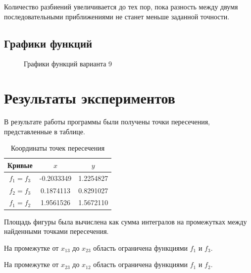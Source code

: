 \documentclass[a4paper,12pt]{article}
\begin{document}
Количество разбиений увеличивается до тех пор, пока разность между двумя последовательными приближениями не станет меньше заданной точности.

\subsection{Графики функций}
\begin{figure}[H]
\centering
{}
\caption{Графики функций варианта 9}
\end{figure}

\newpage
\section{Результаты экспериментов}
В результате работы программы были получены точки пересечения, представленные в таблице.

\begin{table}[H]
\centering
\begin{tabular}{|c|c|c|}
\hline
Кривые & $x$ & $y$ \\
\hline
$f_1=f_3$ & -0.2033349 & 1.2254827 \\
\hline
$f_2=f_3$ & 0.1874113 & 0.8291027 \\
\hline
$f_1=f_2$ & 1.9561526 & 1.5672110 \\
\hline
\end{tabular}
\caption{Координаты точек пересечения}
\end{table}

Площадь фигуры была вычислена как сумма интегралов на промежутках между найденными точками пересечения.

На промежутке от $x_{13}$ до $x_{23}$ область ограничена функциями $f_1$ и $f_3$.

На промежутке от $x_{23}$ до $x_{12}$ область ограничена функциями $f_1$ и $f_2$.
\end{document}
